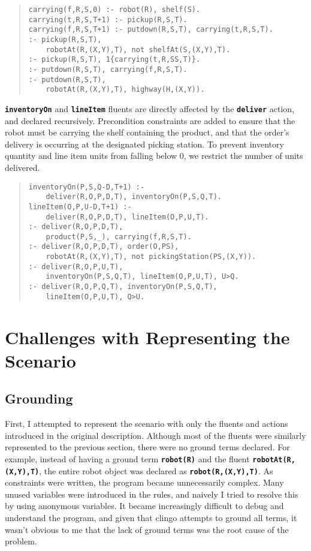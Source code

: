 \documentclass[letterpaper]{article}
\newcommand{\ct}[1]{\texttt{\textbf{#1}}}
\begin{document}
\begin{quote}\begin{scriptsize}\begin{verbatim}
carrying(f,R,S,0) :- robot(R), shelf(S).
carrying(t,R,S,T+1) :- pickup(R,S,T).
carrying(f,R,S,T+1) :- putdown(R,S,T), carrying(t,R,S,T).
:- pickup(R,S,T),
    robotAt(R,(X,Y),T), not shelfAt(S,(X,Y),T).
:- pickup(R,S,T), 1{carrying(t,R,SS,T)}.
:- putdown(R,S,T), carrying(f,R,S,T).
:- putdown(R,S,T),
    robotAt(R,(X,Y),T), highway(H,(X,Y)).
\end{verbatim}\end{scriptsize}\end{quote}

\ct{inventoryOn} and \ct{lineItem} fluents are directly affected by the \ct{deliver} action, and declared recursively. Precondition constraints are added to ensure that the robot must be carrying the shelf containing the product, and that the order's delivery is occurring at the designated picking station. To prevent inventory quantity and line item units from falling below 0, we restrict the number of units delivered.

\begin{quote}\begin{scriptsize}\begin{verbatim}
inventoryOn(P,S,Q-D,T+1) :-
    deliver(R,O,P,D,T), inventoryOn(P,S,Q,T).
lineItem(O,P,U-D,T+1) :-
    deliver(R,O,P,D,T), lineItem(O,P,U,T).
:- deliver(R,O,P,D,T),
    product(P,S,_), carrying(f,R,S,T).
:- deliver(R,O,P,D,T), order(O,PS),
    robotAt(R,(X,Y),T), not pickingStation(PS,(X,Y)).
:- deliver(R,O,P,U,T),
    inventoryOn(P,S,Q,T), lineItem(O,P,U,T), U>Q.
:- deliver(R,O,P,Q,T), inventoryOn(P,S,Q,T),
    lineItem(O,P,U,T), Q>U.
\end{verbatim}\end{scriptsize}\end{quote}


\section{Challenges with Representing the Scenario}

\subsection{Grounding}

First, I attempted to represent the scenario with only the fluents and actions introduced in the original description. Although most of the fluents were similarly represented to the previous section, there were no ground terms declared. For example, instead of having a ground term \ct{robot(R)} and the fluent \ct{robotAt(R,(X,Y),T)}, the entire robot object was declared as \ct{robot(R,(X,Y),T)}. As constraints were written, the program became unnecessarily complex. Many unused variables were introduced in the rules, and naively I tried to resolve this by using anonymous variables. It became increasingly difficult to debug and understand the program, and given that clingo attempts to ground all terms, it wasn't obvious to me that the lack of ground terms was the root cause of the problem.
\end{document}
